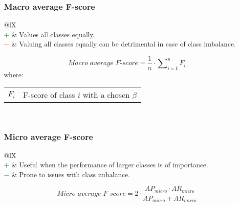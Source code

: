 \documentclass{article}
\makeatletter
\newenvironment{conditions}[1][where:]
    {\hspace{0.02\textwidth} #1 \begin{tabular}[t]{>{$}l<{$} @{${}={}$} l}}
    {\end{tabular}\\[\belowdisplayskip]}
\makeatother
\begin{document}
\subsubsection[Macro average F-score]{Macro average F-score \cite{mohammad2013nrc, takahashi2022confidence}}

\begin{table}[H]\centering
    \begin{tabularx}{\textwidth}{@{}lX}
         \\
        \textcolor{Green}{$+$} & Values all classes equally. \\
        \textcolor{Red}{$-$}   & Valuing all classes equally can be detrimental in case of class imbalance.
    \end{tabularx}
\end{table}

\begin{equation}
    \textit{Macro average F-score} = \dfrac{1}{\textit{n}} \cdot \sum\nolimits_{i = 1}^n \textit{F}_i
%
    \label{equation:MAAF}
\end{equation}
%
\begin{conditions}
    F_i & F-score of class $i$ with a chosen $\beta$
\end{conditions}


\subsubsection[Micro average F-score]{Micro average F-score \cite{goutte2005probabilistic, takahashi2022confidence}}

\begin{table}[H]\centering
    \begin{tabularx}{\textwidth}{@{}lX}
         \\
        \textcolor{Green}{$+$} & Useful when the performance of larger classes is of importance. \\
        \textcolor{Red}{$-$}   & Prone to issues with class imbalance.
    \end{tabularx}
\end{table}

\begin{equation}
    \textit{Micro average F-score} = 2 \cdot \dfrac{\textit{AP}_\textit{micro} \cdot \textit{AR}_\textit{micro}}{\textit{AP}_\textit{micro} + \textit{AR}_\textit{micro}}
%
    \label{equation:MIAF}
\end{equation}
\end{document}
